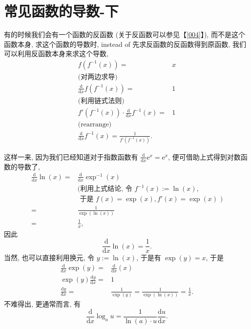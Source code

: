 \section{常见函数的导数-下}\label{014}

\begin{tcolorbox}[size=fbox, breakable, enhanced jigsaw, title={逆函数和导数}]

有的时候我们会有一个函数的反函数 (关于反函数可以参见【\ref{004}】),
而不是这个函数本身, 求这个函数的导数时, instead of
先求反函数的反函数得到原函数, 我们可以利用反函数本身来求这个导数,
\begin{align*}
f(f^{-1}(x))=&x\\
\text{(对两边求导)}\\
\frac{\mathrm{d}}{\mathrm{d}x}f(f^{-1}(x))=&1\\
\text{(利用链式法则)}\\
f'(f^{-1}(x))\cdot\frac{\mathrm{d}}{\mathrm{d}x}f^{-1}(x)=&1\\
\text{(rearrange)}\\
\boxed{\frac{\mathrm{d}}{\mathrm{d}x}f^{-1}(x)=\frac{1}{f'(f^{-1}(x))}}.
\end{align*}

\end{tcolorbox}

\begin{tcolorbox}[size=fbox, breakable, enhanced jigsaw, title={对数函数}]

这样一来, 因为我们已经知道对于指数函数有
$\frac{\mathrm{d}}{\mathrm{d}x}\mathrm{e}^x=\mathrm{e}^x$,
便可借助上式得到对数函数的导数了,
\begin{align*}
\frac{\mathrm{d}}{\mathrm{d}x}\ln(x)=&\frac{\mathrm{d}}{\mathrm{d}x}\exp^{-1}(x)\\
&\text{(利用上式结论, 令 }f^{-1}(x):=\ln(x),\\
&\text{ 于是 }f(x)=\exp(x), f'(x)=\exp(x)\text{ )}\\
=&\frac{1}{\exp(\ln(x))}\\
=&\frac{1}{x},
\end{align*}
因此 \begin{equation*}
\boxed{\frac{\mathrm{d}}{\mathrm{d}x}\ln(x)=\frac{1}{x}}.
\end{equation*} 当然, 也可以直接利用换元, 令 $y:=\ln(x)$, 于是有 $\exp(y)=x$,
于是
\begin{align*}
\frac{\mathrm{d}}{\mathrm{d}x}\exp(y)=&\frac{\mathrm{d}}{\mathrm{d}x}(x)\\
\exp(y)\frac{\mathrm{d}y}{\mathrm{d}x}=&1\\
\frac{\mathrm{d}y}{\mathrm{d}x}=&\frac{1}{\exp(y)}=\frac{1}{\exp(\ln(x))}=\frac{1}{x}.
\end{align*}
不难得出, 更通常而言, 有 \begin{equation*}
\boxed{\frac{\mathrm{d}}{\mathrm{d}x}\log_au=\frac{1}{\ln(a)\cdot u}\frac{\mathrm{d}u}{\mathrm{d}x}}.
\end{equation*}

\end{tcolorbox}

